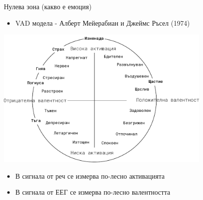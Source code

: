 \documentclass[9pt]{beamer}
\begin{document}
    \begin{frame}{Нулева зона (какво е емоция)}
        \begin{itemize}
            \item VAD модела - Алберт Мейерабиан и Джеймс Ръсел (1974)
        \end{itemize}
        \pause
        \begin{center}
            \includegraphics[width=0.8\textwidth]{valence_arousal}%
        \end{center}
        \pause
        \begin{itemize}
            \item В сигнала от реч се измерва по-лесно активацията
            \pause
            \item В сигнала от ЕЕГ се измерва по-лесно валентността
        \end{itemize}
    \end{frame}
\end{document}
